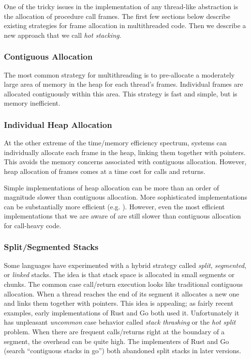 \documentclass[sigplan,10pt,review,anonymous]{acmart}\settopmatter{printfolios=true,printccs=false,printacmref=false}
\begin{document}
One of the tricky issues in the implementation of any thread-like abstraction is the allocation of procedure call frames.
The first few sections below describe existing strategies for frame allocation in multithreaded code.
Then we describe a new approach that we call \emph{hot stacking}.

\subsubsection{Contiguous Allocation}

The most common strategy for multithreading is to pre-allocate a moderately large area of memory in the heap for each thread's frames.
Individual frames are allocated contiguously within this area.
This strategy is fast and simple, but is memory inefficient.

\subsubsection{Individual Heap Allocation}

At the other extreme of the time/memory efficiency spectrum, systems can individually allocate each frame in the heap, linking them together with pointers.
This avoids the memory concerns associated with contiguous allocation.
However, heap allocation of frames comes at a time cost for calls and returns.

Simple implementations of heap allocation can be more than an order of magnitude slower than contiguous allocation.
More sophisticated implementations can be substantially more efficient (e.g. \cite{Shao2000}).
However, even the most efficient implementations that we are aware of are still slower than contiguous allocation for call-heavy code.

\subsubsection{Split/Segmented Stacks}

Some languages have experimented with a hybrid strategy called \emph{split}, \emph{segmented}, or \emph{linked} stacks.
The idea is that stack space is allocated in small segments or chunks.
The common case call/return execution looks like traditional contiguous allocation.
When a thread reaches the end of its segment it allocates a new one and links them together with pointers.
This idea is appealing; as fairly recent examples, early implementations of Rust and Go both used it.
Unfortunately it has unpleasant \emph{uncommon} case behavior called \emph{stack thrashing} or the \emph{hot split} problem.
When there are frequent calls/returns right at the boundary of a segment, the overhead can be quite high.
The implementers of Rust \cite{Anderson2013} and Go (search ``contiguous stacks in go'') both abandoned split stacks in later versions.
\end{document}
